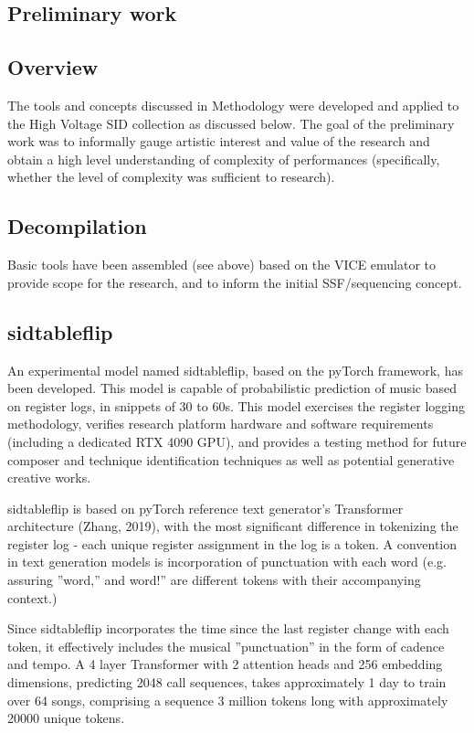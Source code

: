 \documentclass[10pt]{article}
\begin{document}
\begin{multicols*}{2}
\section{Preliminary work}

\subsection{Overview}

The tools and concepts discussed in Methodology were developed and applied to the High Voltage SID collection as discussed below. The goal of the preliminary work was to informally gauge artistic interest and value of the research and obtain a high level understanding of complexity of performances (specifically, whether the level of complexity was sufficient to research).

\subsection{Decompilation}

Basic tools have been assembled (see above) based on the VICE emulator\cite{asidvice} to provide scope for the research, and to inform the initial SSF/sequencing concept.

\subsection{sidtableflip}

An experimental model named sidtableflip\cite{sidtableflip}, based on the pyTorch framework, has been developed. This model is capable of probabilistic prediction of music based on register logs, in snippets of 30 to 60s. This model exercises the register logging methodology, verifies research platform hardware and software requirements (including a dedicated RTX 4090 GPU), and provides a testing method for future composer and technique identification techniques as well as potential generative creative works.

sidtableflip is based on pyTorch reference text generator’s Transformer architecture (Zhang, 2019), with the most significant difference in tokenizing the register log - each unique register assignment in the log is a token. A convention in text generation models is incorporation of punctuation with each word (e.g. assuring ”word,” and word!” are different tokens with their accompanying context.)

Since sidtableflip incorporates the time since the last register change with each token,  it effectively includes the musical ”punctuation” in the form of cadence and tempo. A 4 layer Transformer with 2 attention heads and 256 embedding dimensions, predicting 2048 call sequences, takes approximately 1 day to train over 64 songs, comprising a sequence 3 million tokens long with approximately 20000 unique tokens.


\end{multicols*}
\end{document}

